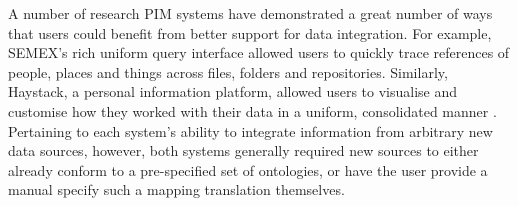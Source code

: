 \documentclass{sigchi}
\begin{document}

A number of research PIM systems have demonstrated a great number of ways that users could benefit from better support for data integration.  For example, SEMEX's \cite{semex} rich uniform query interface allowed users to quickly trace references of people, places and things across files, folders and repositories.  Similarly, Haystack, a personal information platform, allowed users to visualise and customise how they worked with their data in a uniform, consolidated manner \cite{haystack}. Pertaining to each system's ability to integrate information from arbitrary new data sources, however, both systems generally required new sources to either already conform to a pre-specified set of ontologies, or have the user provide a manual specify such a mapping translation themselves.


\end{document}
